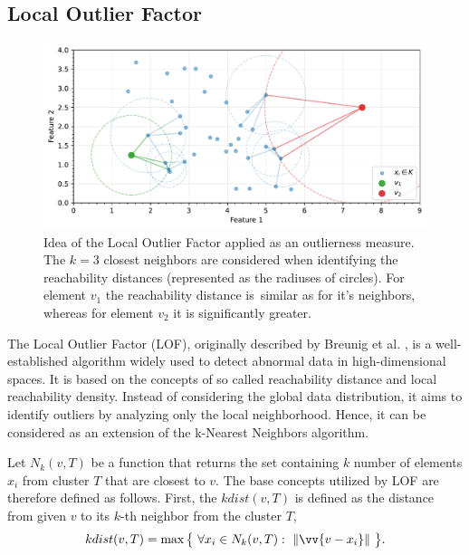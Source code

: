 \subsection{Local Outlier Factor}
\label{section:LOF}

\begin{figure}[t]
    \centering
    \includegraphics[width=\textwidth]{images/measures/lof-distance.pdf}
    \caption{Idea of the Local Outlier Factor applied as an outlierness measure. \\
             The $k=3$ closest neighbors are considered when identifying the reachability distances (represented as the radiuses of circles).
             For element $v_1$ the reachability distance is~similar as for it's neighbors,
             whereas for element $v_2$ it is significantly greater.}
    \label{fig:lof-idea}
\end{figure}

The Local Outlier Factor (LOF), originally described by Breunig et al. \cite{Breunig-2000}, is a well-established algorithm widely used to detect abnormal data in high-dimensional spaces. It is based on the concepts of so called reachability distance and local reachability density. Instead of considering the global data distribution, it aims to identify outliers by analyzing only the local neighborhood. Hence, it can be considered as an extension of the k-Nearest Neighbors algorithm.

Let $N_k(v, T)$ be a function that returns the set containing $k$ number of elements $x_i$ from cluster $T$ that are closest to $v$. The base concepts utilized by LOF are therefore defined as follows. First, the $kdist(v, T)$ is defined as the distance from given $v$ to its $k$-th neighbor from the cluster $T$,
\begin{equation}
    kdist(v, T)
    =
    \max\big\{
        ~
        \forall x_i \in N_k(v, T): ~ \norm{\vv{v - x_i}}
        ~
    \big\}
    .
    \label{eq:kdist}
\end{equation}

